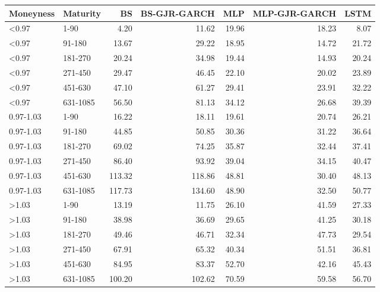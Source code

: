 \begin{tabular}{llrrrrr}
\toprule
Moneyness & Maturity & BS & BS-GJR-GARCH & MLP & MLP-GJR-GARCH & LSTM \\
\midrule
<0.97 & 1-90 & 4.20 & 11.62 & 19.96 & 18.23 & 8.07 \\
<0.97 & 91-180 & 13.67 & 29.22 & 18.95 & 14.72 & 21.72 \\
<0.97 & 181-270 & 20.24 & 34.98 & 19.44 & 14.93 & 20.24 \\
<0.97 & 271-450 & 29.47 & 46.45 & 22.10 & 20.02 & 23.89 \\
<0.97 & 451-630 & 47.10 & 61.27 & 29.41 & 23.91 & 32.22 \\
<0.97 & 631-1085 & 56.50 & 81.13 & 34.12 & 26.68 & 39.39 \\
0.97-1.03 & 1-90 & 16.22 & 18.11 & 19.61 & 20.74 & 26.21 \\
0.97-1.03 & 91-180 & 44.85 & 50.85 & 30.36 & 31.22 & 36.64 \\
0.97-1.03 & 181-270 & 69.02 & 74.25 & 35.87 & 32.44 & 37.41 \\
0.97-1.03 & 271-450 & 86.40 & 93.92 & 39.04 & 34.15 & 40.47 \\
0.97-1.03 & 451-630 & 113.32 & 118.86 & 48.81 & 30.40 & 48.13 \\
0.97-1.03 & 631-1085 & 117.73 & 134.60 & 48.90 & 32.50 & 50.77 \\
>1.03 & 1-90 & 13.19 & 11.75 & 26.10 & 41.59 & 27.33 \\
>1.03 & 91-180 & 38.98 & 36.69 & 29.65 & 41.25 & 30.18 \\
>1.03 & 181-270 & 49.46 & 46.71 & 32.34 & 47.73 & 29.54 \\
>1.03 & 271-450 & 67.91 & 65.32 & 40.34 & 51.51 & 36.81 \\
>1.03 & 451-630 & 84.95 & 83.37 & 52.70 & 42.16 & 45.43 \\
>1.03 & 631-1085 & 100.20 & 102.62 & 70.59 & 59.58 & 56.70 \\
\bottomrule
\end{tabular}
